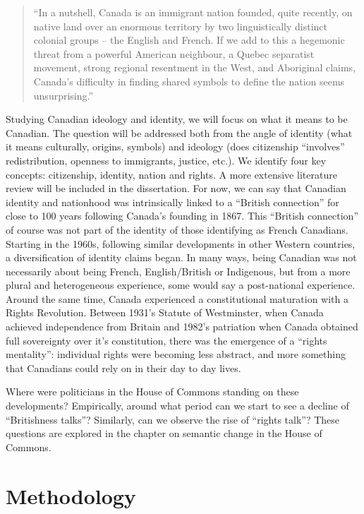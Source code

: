 \documentclass[
  openany]{book}
\begin{document}
\begin{quote}
``In a nutshell, Canada is an immigrant nation founded, quite recently, on native land over an enormous territory by two linguistically distinct colonial groups -- the English and French. If we add to this a hegemonic threat from a powerful American neighbour, a Quebec separatist movement, strong regional resentment in the West, and Aboriginal claims, Canada's difficulty in finding shared symbols to define the nation seems unsurprising.''
\end{quote}

Studying Canadian ideology and identity, we will focus on what it means to be Canadian. The question will be addressed both from the angle of identity (what it means culturally, origins, symbols) and ideology (does citizenship ``involves'' redistribution, openness to immigrants, justice, etc.). We identify four key concepts: citizenship, identity, nation and rights. A more extensive literature review will be included in the dissertation. For now, we can say that Canadian identity and nationhood was intrinsically linked to a ``British connection'' for close to 100 years following Canada's founding in 1867. This ``British connection'' of course was not part of the identity of those identifying as French Canadians. Starting in the 1960s, following similar developments in other Western countries, a diversification of identity claims began. In many ways, being Canadian was not necessarily about being French, English/British or Indigenous, but from a more plural and heterogeneous experience, some would say a post-national experience. Around the same time, Canada experienced a constitutional maturation with a Rights Revolution. Between 1931's Statute of Westminster, when Canada achieved independence from Britain and 1982's patriation when Canada obtained full sovereignty over it's constitution, there was the emergence of a ``rights mentality'': individual rights were becoming less abstract, and more something that Canadians could rely on in their day to day lives.

Where were politicians in the House of Commons standing on these developments? Empirically, around what period can we start to see a decline of ``Britishness talks''? Similarly, can we observe the rise of ``rights talk''? These questions are explored in the chapter on semantic change in the House of Commons.

\hypertarget{methodology}{%
\chapter{Methodology}\label{methodology}}
\end{document}
